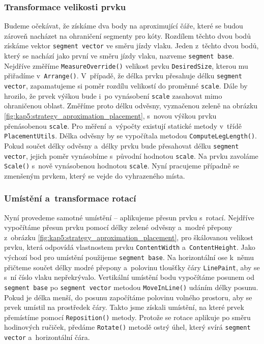 \subsubsection*{Transformace velikosti prvku}
Budeme očekávat, že získáme dva body na aproximující čáře, které se budou zároveň nacházet na ohraničení segmenty pro kóty. Rozdílem těchto dvou bodů získáme vektor \texttt{segment vector} ve směru jízdy vlaku. Jeden z~těchto dvou bodů, který se nachází jako první ve směru jízdy vlaku, nazveme \texttt{segment base}. Nejdříve změříme \texttt{MeasureOverride()} velikost prvku \texttt{DesiredSize}, kterou mu přiřadíme v~\texttt{Arrange()}. V~případě, že délka prvku přesahuje délku \texttt{segment vector}, zapamatujeme si poměr rozdílu velikostí do proměnné \texttt{scale}. Dále by hrozilo, že prvek výškou bude i~po vynásobení \texttt{scale} zasahovat mimo ohraničenou oblast. Změříme proto délku odvěsny, vyznačenou zeleně na obrázku \ref{fig:kap5:strategy_aproximation_placement}, s~novou výškou prvku přenásobenou \texttt{scale}. Pro měření a~výpočty existují statické metody v~třídě \texttt{PlacementUtils}. Délka odvěsny by se vypočítala metodou \texttt{ComputeLegLength()}. Pokud součet délky odvěsny a~délky prvku bude přesahovat délku \texttt{segment vector}, jejich poměr vynásobíme s~původní hodnotou \texttt{scale}. Na prvku zavoláme \texttt{Scale()} s~nově vynásobenou hodnotou \texttt{scale}. Nyní pracujeme případně se zmenšeným prvkem, který se vejde do vyhrazeného místa.

\subsubsection*{Umístění a~transformace rotací}
Nyní provedeme samotné umístění -- aplikujeme přesun prvku s~rotací. \linebreak Nejdříve vypočítáme přesun prvku pomocí délky zelené odvěsny a~modré přepony z~obrázku \ref{fig:kap5:strategy_aproximation_placement}, pro škálovanou velikost prvku, která odpovídá vlastnostem prvku \texttt{ContentWidth} a~\texttt{ContentHeight}. Jako výchozí bod pro umístění použijeme \texttt{segment base}. Na horizontální ose k~němu přičteme součet délky modré přepony a~polovinu tloušťky čáry \texttt{LinePaint}, aby se s~ní číslo vlaku nepřekrývalo. Vertikální umístění bodu vypočítáme posunem od \texttt{segment base} po \texttt{segment vector} metodou \texttt{MoveInLine()} udáním délky posunu. Pokud je délka menší, do posunu započítáme polovinu volného prostoru, aby se prvek umístil na prostředek čáry. Takto jsme získali umístění, na které prvek přemístíme pomocí \texttt{Reposition()} metody. Protože se rotace aplikuje po směru hodinových ručiček, předáme \texttt{Rotate()} metodě ostrý úhel, který svírá \texttt{segment vector} a~horizontální čára.

